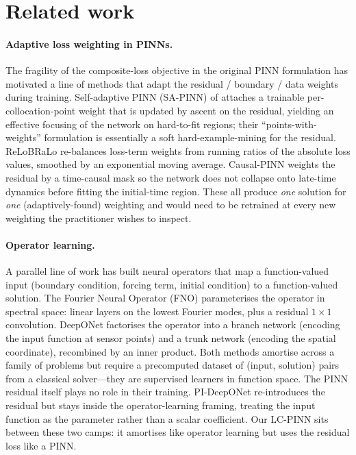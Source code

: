 \documentclass{article}
\theoremstyle{plain}
\theoremstyle{definition}
\theoremstyle{remark}
\begin{document}
\section{Related work}
\label{sec:related}

\paragraph{Adaptive loss weighting in PINNs.}
The fragility of the composite-loss objective in the original PINN
formulation \citep{raissi2019} has motivated a line of methods that
adapt the residual / boundary / data weights during training.
Self-adaptive PINN (SA-PINN) of \citet{mcclenny2020} attaches a
trainable per-collocation-point weight that is updated by ascent on
the residual, yielding an effective focusing of the network on
hard-to-fit regions; their ``points-with-weights'' formulation is
essentially a soft hard-example-mining for the residual. ReLoBRaLo
\citep{bischof2021} re-balances loss-term weights from running
ratios of the absolute loss values, smoothed by an exponential moving
average. Causal-PINN \citep{wang2024} weights the residual by a
time-causal mask so the network does not collapse onto late-time
dynamics before fitting the initial-time region. These all produce
\emph{one} solution for \emph{one} (adaptively-found) weighting and
would need to be retrained at every new weighting the practitioner
wishes to inspect.

\paragraph{Operator learning.}
A parallel line of work has built neural operators that map a
function-valued input (boundary condition, forcing term, initial
condition) to a function-valued solution. The Fourier Neural Operator
(FNO) \citep{li2020fno} parameterises the operator in spectral space:
linear layers on the lowest Fourier modes, plus a residual
$1\!\times\!1$ convolution. DeepONet \citep{lu2021deeponet} factorises
the operator into a branch network (encoding the input function at
sensor points) and a trunk network (encoding the spatial coordinate),
recombined by an inner product. Both methods amortise across a family
of problems but require a precomputed dataset of (input, solution)
pairs from a classical solver---they are supervised learners in
function space. The PINN residual itself plays no role in their
training. PI-DeepONet \citep{wang2021pi-deeponet} re-introduces the
residual but stays inside the operator-learning framing, treating the
input function as the parameter rather than a scalar coefficient.
Our LC-PINN sits between these two camps: it amortises like
operator learning but uses the residual loss like a PINN.
\end{document}
